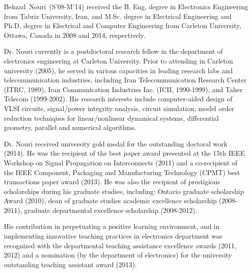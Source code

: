 \begin{IEEEbiography}{Behzad~Nouri~(S'08-M'14)} received the B. Eng. degree in Electronics Engineering from Tabriz University, Iran, and M.Sc. degree in Electrical Engineering and Ph.D. degree in Electrical and Computer Engineering from Carleton University, Ottawa, Canada in 2008 and 2014, respectively. \par

Dr. Nouri currently is a postdoctoral research fellow in the department of electronics engineering at Carleton University. Prior to attending in Carleton university (2005), he served in various capacities in leading research labs and telecommunication industries, including Iran Telecommunication Research Center (ITRC, 1989), Iran Communication Industries Inc. (ICII, 1990-1999), and Taher Telecom (1999-2002). His research interests include computer-aided design of VLSI circuits, signal/power integrity analysis, circuit simulation, model order reduction techniques for linear/nonlinear dynamical systems, differential geometry, parallel and numerical algorithms.  \par

Dr. Nouri received university gold medal for the outstanding doctoral work (2014). He was the recipient of the best paper award presented at the 15th IEEE Workshop on Signal Propagation on Interconnects (2011) and a co-recipient of the IEEE Component, Packaging and Manufacturing Technology (CPMT) best transactions paper award (2013). He was also the recipient of prestigious scholarships during his graduate studies, including: Ontario graduate scholarship Award (2010), dean of graduate studies academic excellence scholarship (2008-2011), graduate departmental excellence scholarship (2008-2012)\@. \par

His  contribution in  perpetuating a positive learning  environment, and in implementing innovative teaching practices in electronics department was recognized with the departmental teaching assistance excellence awards (2011, 2012) and a nomination (by the department of electronics) for the university outstanding teaching assistant award (2013).
\end{IEEEbiography}
